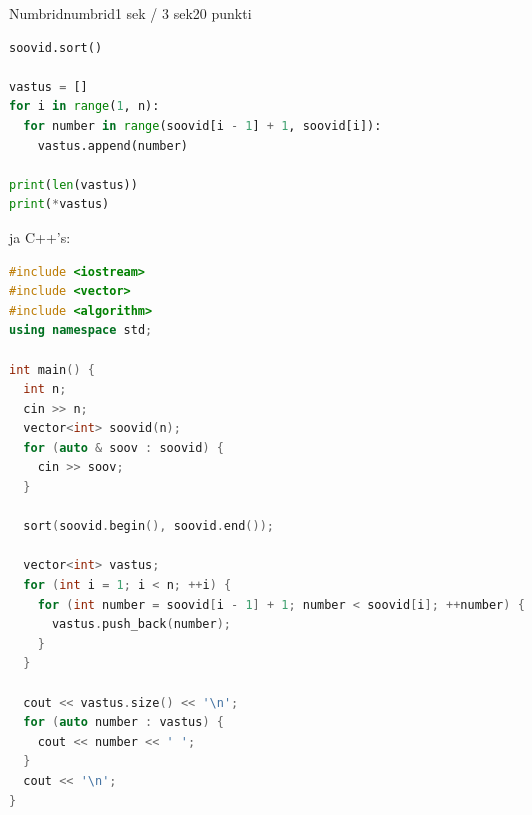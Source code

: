 \begin{yl}{2}{Numbrid}{numbrid}{1 sek / 3 sek}{20 punkti}
\begin{lstlisting}[language=Python]
soovid.sort()

vastus = []
for i in range(1, n):
  for number in range(soovid[i - 1] + 1, soovid[i]):
    vastus.append(number)

print(len(vastus))
print(*vastus)
\end{lstlisting}
ja C++'s:
\begin{lstlisting}[language=C++]
#include <iostream>
#include <vector>
#include <algorithm>
using namespace std;

int main() {
  int n;
  cin >> n;
  vector<int> soovid(n);
  for (auto & soov : soovid) {
    cin >> soov;
  }

  sort(soovid.begin(), soovid.end());

  vector<int> vastus;
  for (int i = 1; i < n; ++i) {
    for (int number = soovid[i - 1] + 1; number < soovid[i]; ++number) {
      vastus.push_back(number);
    }
  }

  cout << vastus.size() << '\n';
  for (auto number : vastus) {
    cout << number << ' ';
  }
  cout << '\n';
}
\end{lstlisting}

\end{yl}
